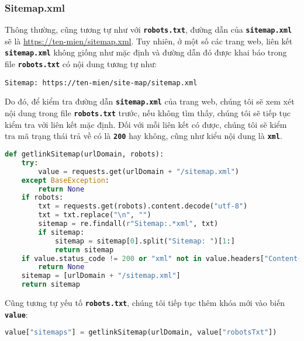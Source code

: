 \subsubsection{Sitemap.xml}
Thông thường, cũng tương tự như với \textbf{\texttt{robots.txt}}, đường dẫn của \textbf{\texttt{sitemap.xml}} sẽ là \url{https://ten-mien/sitemap.xml}. Tuy nhiên, ở một số các trang web, liên kết \textbf{\texttt{sitemap.xml}} không giống như mặc định và đường dẫn đó được khai báo trong file \textbf{\texttt{robots.txt}} có nội dung tương tự như:
\begin{lstlisting}
Sitemap: https://ten-mien/site-map/sitemap.xml
\end{lstlisting}
\par
Do đó, để kiểm tra đường dẫn \textbf{\texttt{sitemap.xml}} của trang web, chúng tôi sẽ xem xét nội dung trong file \textbf{\texttt{robots.txt}} trước, nếu không tìm thấy, chúng tôi sẽ tiếp tục kiểm tra với liên kết mặc định. Đối với mỗi liên kết có được, chúng tôi sẽ kiểm tra mã trạng thái trả về có là \textbf{\texttt{200}} hay không, cũng như kiểu nội dung là \textbf{\texttt{xml}}.
\begin{lstlisting}[language=Python]
def getlinkSitemap(urlDomain, robots):
    try:
        value = requests.get(urlDomain + "/sitemap.xml")
    except BaseException:
        return None
    if robots:
        txt = requests.get(robots).content.decode("utf-8")
        txt = txt.replace("\n", "")
        sitemap = re.findall(r"Sitemap:.*xml", txt)
        if sitemap:
            sitemap = sitemap[0].split("Sitemap: ")[1:]
            return sitemap
    if value.status_code != 200 or "xml" not in value.headers["Content-Type"]:
        return None
    sitemap = [urlDomain + "/sitemap.xml"]
    return sitemap
\end{lstlisting}
\par
Cũng tương tự yếu tố \textbf{\texttt{robots.txt}}, chúng tôi tiếp tục thêm khóa mới vào biến \textbf{\texttt{value}}:
\begin{lstlisting}[language=Python]
value["sitemaps"] = getlinkSitemap(urlDomain, value["robotsTxt"])
\end{lstlisting}